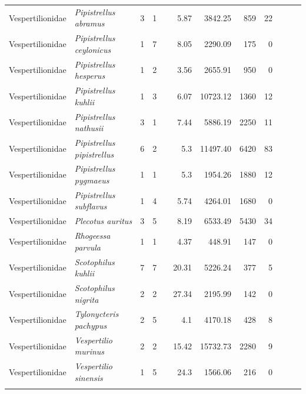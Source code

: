 \begin{landscape}
\begin{longtable}{@{}llrrrrrrrrrl@{}}
  Vespertilionidae & \emph{Pipistrellus abramus} & 3 & 1 &  & 5.87 & 3842.25 & 859 & 22 &  &  &  \\ 
  Vespertilionidae & \emph{Pipistrellus ceylonicus} & 1 & 7 &  & 8.05 & 2290.09 & 175 & 0 &  &  &  \\ 
  Vespertilionidae & \emph{Pipistrellus hesperus} & 1 & 2 &  & 3.56 & 2655.91 & 950 & 0 &  &  &  \\ 
  Vespertilionidae & \emph{Pipistrellus kuhlii} & 1 & 3 &  & 6.07 & 10723.12 & 1360 & 12 &  &  &  \\ 
  Vespertilionidae & \emph{Pipistrellus nathusii} & 3 & 1 &  & 7.44 & 5886.19 & 2250 & 11 &  &  &  \\ 
  Vespertilionidae & \emph{Pipistrellus pipistrellus} & 6 & 2 &  & 5.3 & 11497.40 & 6420 & 83 &  &  &  \\ 
  Vespertilionidae & \emph{Pipistrellus pygmaeus} & 1 & 1 &  & 5.3 & 1954.26 & 1880 & 12 &  &  &  \\ 
  Vespertilionidae & \emph{Pipistrellus subflavus} & 1 & 4 &  & 5.74 & 4264.01 & 1680 & 0 &  &  &  \\ 
  Vespertilionidae & \emph{Plecotus auritus} & 3 & 5 &  & 8.19 & 6533.49 & 5430 & 34 &  &  &  \\ 
  Vespertilionidae & \emph{Rhogeessa parvula} & 1 & 1 &  & 4.37 & 448.91 & 147 & 0 &  &  &  \\ 
  Vespertilionidae & \emph{Scotophilus kuhlii} & 7 & 7 &  & 20.31 & 5226.24 & 377 & 5 &  &  &  \\ 
  Vespertilionidae & \emph{Scotophilus nigrita} & 2 & 2 &  & 27.34 & 2195.99 & 142 & 0 &  &  &  \\ 
  Vespertilionidae & \emph{Tylonycteris pachypus} & 2 & 5 &  & 4.1 & 4170.18 & 428 & 8 &  &  &  \\ 
  Vespertilionidae & \emph{Vespertilio murinus} & 2 & 2 &  & 15.42 & 15732.73 & 2280 & 9 &  &  &  \\ 
  Vespertilionidae & \emph{Vespertilio sinensis} & 1 & 5 &  & 24.3 & 1566.06 & 216 & 0 &  &  &  \\ 
   \bottomrule
\label{A-rawData}
\end{longtable}
\endgroup

\end{landscape}

























